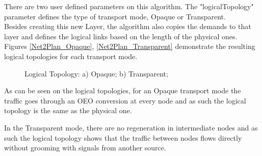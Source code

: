 	There are two user defined parameters on this algorithm. The "logicalTopology" parameter defines the type of transport mode, Opaque or Transparent.\\
	
	
	Besides creating this new Layer, the algorithm also copies the demands to that layer and defines the logical links based on the length of the physical ones.
	Figures \ref{Net2Plan_Opaque}, \ref{Net2Plan_Transparent}  demonstrate the resulting logical topologies for each transport mode.
	
			\begin{figure}[!h]
				\centering
				
				\caption{Logical Topology: a) Opaque; b) Transparent;}								
			\end{figure}	

	As can be seen on the logical topologies, for an Opaque transport mode the traffic goes through an OEO conversion at every node and as such the logical topology is the same as the physical one.
	
	In the Transparent mode, there are no regeneration in intermediate nodes and as such the logical topology shows that the traffic between nodes flows directly without grooming with signals from another source.
	
	\pagebreak
